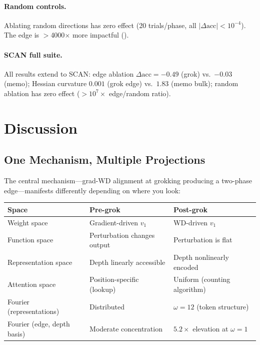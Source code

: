\documentclass[11pt]{article}
\begin{document}
\paragraph{Random controls.}
Ablating random directions has zero effect (20 trials/phase, all $|\Delta\text{acc}| < 10^{-4}$).
The edge is $>$4000$\times$ more impactful ().

\paragraph{SCAN full suite.}
All results extend to SCAN: edge ablation $\Delta\text{acc} = -0.49$ (grok) vs.\ $-0.03$ (memo); Hessian curvature $0.001$ (grok edge) vs.\ $1.83$ (memo bulk); random ablation has zero effect ($>10^7\times$ edge/random ratio).


\section{Discussion}
\label{sec:discussion}

\subsection{One Mechanism, Multiple Projections}

The central mechanism---grad-WD alignment at grokking producing a two-phase edge---manifests differently depending on where you look:

\begin{center}
\begin{tabular}{lll}
\toprule
\textbf{Space} & \textbf{Pre-grok} & \textbf{Post-grok} \\
\midrule
Weight space & Gradient-driven $v_1$ & WD-driven $v_1$ \\
Function space & Perturbation changes output & Perturbation is flat \\
Representation space & Depth linearly accessible & Depth nonlinearly encoded \\
Attention space & Position-specific (lookup) & Uniform (counting algorithm) \\
Fourier (representations) & Distributed & $\omega = 12$ (token structure) \\
Fourier (edge, depth basis) & Moderate concentration & $5.2\times$ elevation at $\omega = 1$ \\
\bottomrule
\end{tabular}
\end{center}
\end{document}
